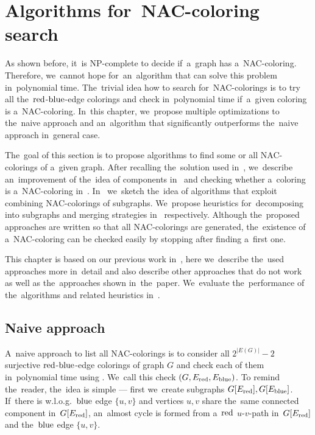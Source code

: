\chapter{Algorithms for~NAC-coloring search}%
\label{chapter:algo}

\begin{chapterabstract}

	As shown before, it~is NP-complete to decide if~a~graph has a~NAC-coloring.
	Therefore, we~cannot hope for~an~algorithm that can solve this problem in~polynomial time.
	The~trivial idea how to search for~NAC-colorings is to
	try all the~\( \text{red} \)-\( \text{blue} \)-edge colorings
	and check in~polynomial time if~a~given coloring is a~NAC-coloring.
	In~this chapter, we~propose multiple optimizations to the~naive approach
	and an~algorithm that significantly outperforms the~naive approach in~general case.

\end{chapterabstract}

The~goal of this section is to propose algorithms to find some or all NAC-colorings of a~given graph.
After recalling the~solution used in~\flexrilog{},
we~describe an~improvement of the~idea of \trcon{} components in~
and checking whether a~coloring is a~NAC-coloring in~.
In~ we~sketch the~idea of algorithms that
exploit combining NAC-colorings of subgraphs.
We~propose heuristics for~decomposing into subgraphs and merging strategies
in~ respectively.
Although the~proposed approaches are written so that all NAC-colorings are generated,
the~existence of a~NAC-coloring can be checked easily by stopping after finding a~first one.

This chapter is based on our previous work in~\cite{my_paper},
here we~describe the~used approaches more in~detail
and also describe other approaches that do not work as well as the~approaches
shown in~the~paper. We~evaluate the~performance
of the~algorithms and related heuristics in~.

\section{Naive approach}

A~naive approach to list all NAC-colorings is to consider
all $2^{|E(G)|} - 2$ surjective \( \text{red} \)-\( \text{blue} \)-edge colorings of graph $G$
and check each of them in~polynomial time using .
We~call this check \IsNACColoring{}$(G, E_{\text{red}}, E_{\text{blue}})$.
To remind the~reader, the~idea is simple
--- first we~create subgraphs \( G[E_{\text{red}}], G[E_{\text{blue}}] \).
If~there is w.l.o.g.\ \( \text{blue} \) edge \( \{u, v\} \)
and vertices \( u, v \) share the~same connected component in~\( G[E_{\text{red}}] \),
an~almost cycle is formed from a~\( \text{red} \) \( u \)-\( v \)-path in~\( G[E_{\text{red}}] \)
and the~\( \text{blue} \) edge \( \{u, v\} \).

